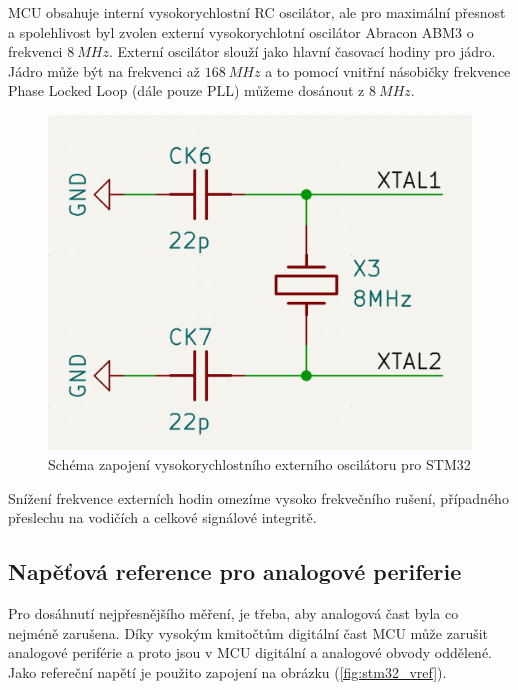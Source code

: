 MCU obsahuje interní vysokorychlostní RC oscilátor, ale pro maximální přesnost a spolehlivost byl zvolen externí vysokorychlotní oscilátor Abracon ABM3 o frekvenci  $8 \ MHz$. Externí oscilátor slouží jako hlavní časovací hodiny pro
jádro. Jádro může být na frekvenci až $168 \ MHz$ a to pomocí vnitřní násobičky frekvence Phase Locked Loop (dále pouze PLL) můžeme dosánout z $8 \ MHz$.

\begin{figure}[H]
    \centering
    \includegraphics[width=0.8\linewidth]{pictures/stm32_hse.jpg}
    \caption{Schéma zapojení vysokorychlostního externího oscilátoru pro STM32}
    \label{fig:stm32_hse}
\end{figure}

Snížení frekvence externích hodin omezíme vysoko frekvečního rušení, případného přeslechu na vodičích a celkové signálové integritě.


\subsection{Napěťová reference pro analogové periferie} \label{section:vref}
Pro dosáhnutí nejpřesnějšího měření, je třeba, aby analogová čast byla co nejméně zarušena. Díky vysokým kmitočtům digitální čast MCU může zarušit analogové periférie a proto jsou v MCU digitální a analogové obvody oddělené.
Jako refereční napětí je použito zapojení na obrázku (\ref{fig:stm32_vref}).

